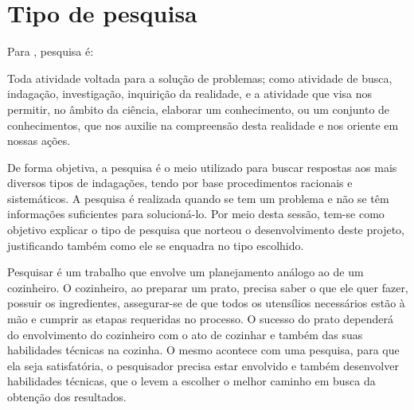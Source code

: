 \section{Tipo de pesquisa}

\par Para , pesquisa é:

\begin{citacao}
	Toda atividade voltada para a solução de problemas; como atividade de busca, indagação, investigação, inquirição da realidade, e a atividade que visa nos permitir, no âmbito da ciência, elaborar um  conhecimento, ou um conjunto de conhecimentos, que nos auxilie na compreensão desta realidade e nos oriente em nossas ações.
\end{citacao}


\par De forma objetiva, a pesquisa é o meio utilizado para buscar respostas aos mais diversos tipos de indagações, tendo por base procedimentos racionais e sistemáticos. A pesquisa é realizada quando se tem um problema e não se têm informações suficientes para solucioná-lo. Por meio desta sessão, tem-se como objetivo explicar o tipo de pesquisa que norteou o desenvolvimento deste projeto, justificando também como ele se enquadra no tipo escolhido.

\par Pesquisar é um trabalho que envolve um planejamento análogo ao de um cozinheiro. O cozinheiro, ao preparar um prato, precisa saber o que ele quer fazer, possuir os ingredientes, assegurar-se de que todos os utensílios necessários estão à mão e cumprir as etapas requeridas no processo. O sucesso do prato dependerá do envolvimento do cozinheiro com o ato de cozinhar e também das suas habilidades técnicas na cozinha. O mesmo acontece com uma pesquisa, para que ela seja satisfatória, o pesquisador precisa estar envolvido e também desenvolver habilidades técnicas, que o levem a escolher o melhor caminho em busca da obtenção dos resultados.

